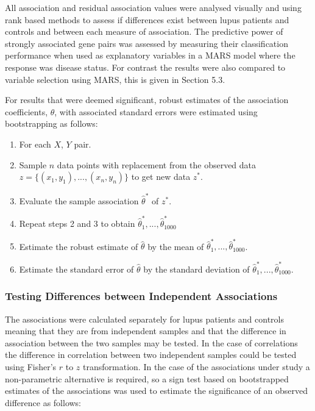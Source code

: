 \documentclass[a4paper, 12pt]{report}
\begin{document}
All association and residual association values were analysed visually and using rank based methods to assess if differences exist between lupus patients and controls and between each measure of association. The predictive power of strongly associated gene pairs was assessed by measuring their classification performance when used as explanatory variables in a MARS model where the response was disease status. For contrast the results were also compared to variable selection using MARS, this is given in Section 5.3.

 For results that were deemed significant, robust estimates of the association coefficients, $\hat{\theta}$, with associated standard errors were estimated using bootstrapping as follows:

\begin{enumerate}

\item For each $X$, $Y$ pair.
\item Sample $n$ data points with replacement from the observed data $z = \{ (x_1,y_1),...,(x_n,y_n) \}$ to get new data $z^*$.
\item Evaluate the sample association $\hat{\theta}^*$ of $z^*$.
\item Repeat steps 2 and 3 to obtain $\hat{\theta}_1^*,...,\hat{\theta}_{1000}^*$
\item Estimate the robust estimate of $\hat{\theta}$ by the mean of $\hat{\theta}_1^*,...,\hat{\theta}_{1000}^*$.
\item Estimate the standard error of $\hat{\theta}$ by the standard deviation of $\hat{\theta}_1^*,...,\hat{\theta}_{1000}^*$.

\end{enumerate}

\subsubsection{Testing Differences between Independent Associations}
The associations were calculated separately for lupus patients and controls meaning that they are from independent samples and that the difference in association between the two samples may be tested. In the case of correlations the difference in correlation between two independent samples could be tested using Fisher's $r$ to $z$ transformation.  In the case of the associations under study a non-parametric alternative is required, so a sign test based on bootstrapped estimates of the associations was used to estimate the significance of an observed difference as follows:
\end{document}
